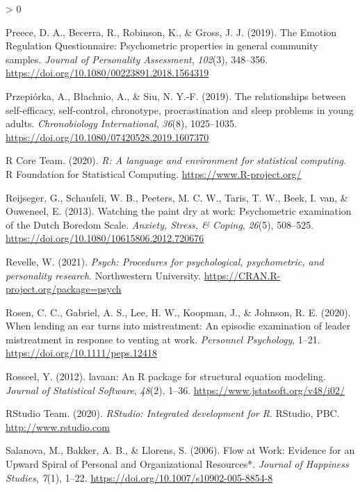 \documentclass[
  english,
  man,floatsintext]{apa6}
\newlength{\cslhangindent}
\newenvironment{CSLReferences}[2] %
 {%
  \setlength{\parindent}{0pt}
  \ifodd #1 \everypar{\setlength{\hangindent}{\cslhangindent}}\ignorespaces\fi
  \ifnum #2 > 0
  \setlength{\parskip}{#2\baselineskip}
  \fi
 }%
 {}
\begin{document}
\begin{CSLReferences}{1}{0}
\leavevmode\hypertarget{ref-Preece2019}{}%
Preece, D. A., Becerra, R., Robinson, K., \& Gross, J. J. (2019). {The Emotion Regulation Questionnaire: Psychometric} properties in general community samples. \emph{Journal of Personality Assessment}, \emph{102}(3), 348--356. \url{https://doi.org/10.1080/00223891.2018.1564319}

\leavevmode\hypertarget{ref-Przepiorka2019}{}%
Przepiórka, A., Błachnio, A., \& Siu, N. Y.-F. (2019). The relationships between self-efficacy, self-control, chronotype, procrastination and sleep problems in young adults. \emph{Chronobiology International}, \emph{36}(8), 1025--1035. \url{https://doi.org/10.1080/07420528.2019.1607370}

\leavevmode\hypertarget{ref-RCT2020}{}%
R Core Team. (2020). \emph{R: {A} language and environment for statistical computing}. R Foundation for Statistical Computing. \url{https://www.R-project.org/}

\leavevmode\hypertarget{ref-Reijseger2013}{}%
Reijseger, G., Schaufeli, W. B., Peeters, M. C. W., Taris, T. W., Beek, I. van, \& Ouweneel, E. (2013). Watching the paint dry at work: Psychometric examination of the {Dutch} {Boredom} {Scale}. \emph{Anxiety, Stress, \& Coping}, \emph{26}(5), 508--525. \url{https://doi.org/10.1080/10615806.2012.720676}

\leavevmode\hypertarget{ref-Revelle2021}{}%
Revelle, W. (2021). \emph{Psych: {P}rocedures for psychological, psychometric, and personality research}. Northwestern University. \url{https://CRAN.R-project.org/package=psych}

\leavevmode\hypertarget{ref-Rosen2020}{}%
Rosen, C. C., Gabriel, A. S., Lee, H. W., Koopman, J., \& Johnson, R. E. (2020). When lending an ear turns into mistreatment: {An} episodic examination of leader mistreatment in response to venting at work. \emph{Personnel Psychology}, 1--21. \url{https://doi.org/10.1111/peps.12418}

\leavevmode\hypertarget{ref-Rosseel2012}{}%
Rosseel, Y. (2012). {lavaan}: {A}n {R} package for structural equation modeling. \emph{Journal of Statistical Software}, \emph{48}(2), 1--36. \url{https://www.jstatsoft.org/v48/i02/}

\leavevmode\hypertarget{ref-RStudioTeam2020}{}%
RStudio Team. (2020). \emph{{RStudio}: {Integrated} development for {R}}. RStudio, PBC. \url{http://www.rstudio.com}

\leavevmode\hypertarget{ref-Salanova2006}{}%
Salanova, M., Bakker, A. B., \& Llorens, S. (2006). Flow at {Work}: {Evidence} for an {Upward} {Spiral} of {Personal} and {Organizational} {Resources}*. \emph{Journal of Happiness Studies}, \emph{7}(1), 1--22. \url{https://doi.org/10.1007/s10902-005-8854-8}


\end{CSLReferences}
\end{document}
